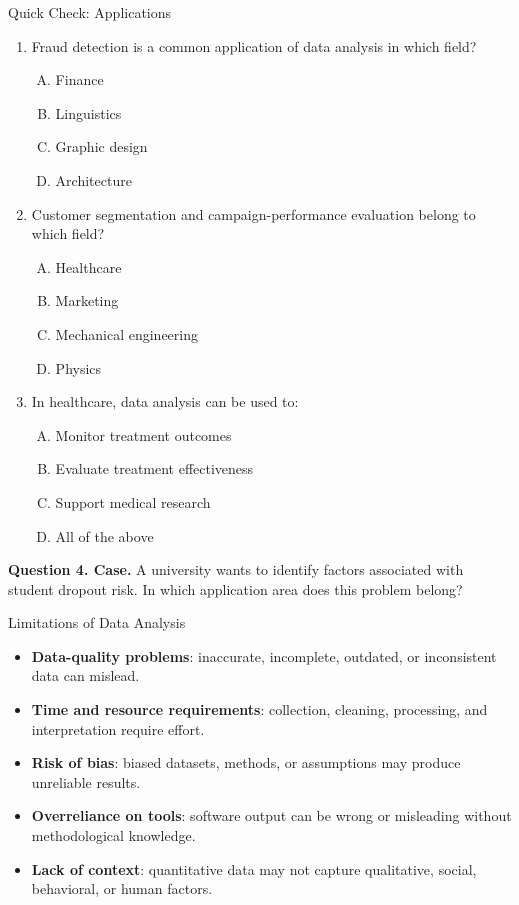 \documentclass[aspectratio=169,11pt]{beamer}
\newcommand{\key}[1]{\textbf{\textcolor{AccentGreen}{#1}}}
\newcommand{\quiztitle}[1]{\textbf{\textcolor{QuizOrange}{#1}}}
\begin{document}
\begin{frame}{Quick Check: Applications}
\begin{enumerate}
  \item Fraud detection is a common application of data analysis in which field?
  \begin{enumerate}[A.]
    \item Finance \item Linguistics \item Graphic design \item Architecture
  \end{enumerate}
  \item Customer segmentation and campaign-performance evaluation belong to which field?
  \begin{enumerate}[A.]
    \item Healthcare \item Marketing \item Mechanical engineering \item Physics
  \end{enumerate}
  \item In healthcare, data analysis can be used to:
  \begin{enumerate}[A.]
    \item Monitor treatment outcomes
    \item Evaluate treatment effectiveness
    \item Support medical research
    \item All of the above
  \end{enumerate}
\end{enumerate}
\quiztitle{Question 4. Case.} A university wants to identify factors associated with student dropout risk. In which application area does this problem belong?
\end{frame}

\begin{frame}{Limitations of Data Analysis}
\begin{itemize}
  \item \key{Data-quality problems}: inaccurate, incomplete, outdated, or inconsistent data can mislead.
  \item \key{Time and resource requirements}: collection, cleaning, processing, and interpretation require effort.
  \item \key{Risk of bias}: biased datasets, methods, or assumptions may produce unreliable results.
  \item \key{Overreliance on tools}: software output can be wrong or misleading without methodological knowledge.
  \item \key{Lack of context}: quantitative data may not capture qualitative, social, behavioral, or human factors.
\end{itemize}
\end{frame}
\end{document}
